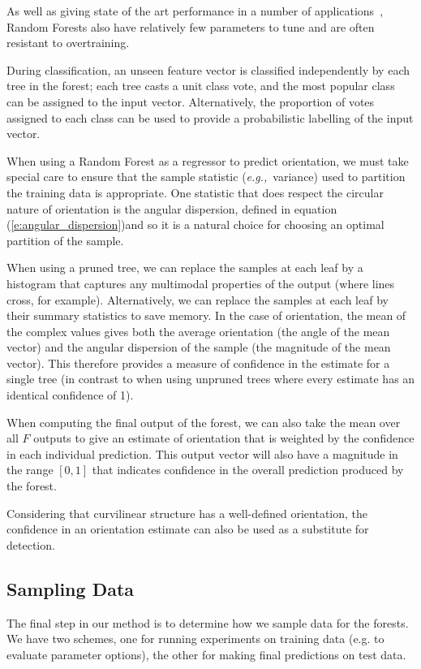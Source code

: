 \documentclass{IEEEtran}
\def\eg{\emph{e.g.,}}
\newcommand{\eref}[1]{(\ref{#1})}
\begin{document}
As well as giving state of the art performance in a number of applications~\cite{Criminisi}, Random Forests also have relatively few parameters to tune and are often resistant to overtraining.

%
During classification, an unseen feature vector is classified independently by each tree in the forest; each tree casts a unit class vote, and the most popular class can be assigned to the input vector. Alternatively, the proportion of votes assigned to each class can be used to provide a probabilistic labelling of the input vector.

When using a Random Forest as a regressor to predict orientation, we must take special care to ensure that the sample statistic (\eg~variance) used to partition the training data is appropriate. One statistic that does respect the circular nature of orientation is the angular dispersion, defined in equation \eref{e:angular_dispersion}and so it is a natural choice for choosing an optimal partition of the sample.

When using a pruned tree, we can replace the samples at each leaf by a histogram that captures  any multimodal properties of the output (where lines cross, for example). Alternatively, we can replace the samples at each leaf by their summary statistics to save memory. In the case of orientation, the mean of the complex values gives both the average orientation (the angle of the mean vector) and the angular dispersion of the sample (the magnitude of the mean vector). This therefore provides a measure of confidence in the estimate for a single tree (in contrast to when using unpruned trees where every estimate has an identical confidence of 1).

When computing the final output of the forest, we can also take the mean over all $F$ outputs to give an estimate of orientation that is weighted by the confidence in each individual prediction. This output vector will also have a magnitude in the range $[0,1]$ that indicates confidence in the overall prediction produced by the forest.

Considering that curvilinear structure has a well-defined orientation, the confidence in an orientation estimate can also be used as a substitute for detection.

\subsection{Sampling Data}
\label{s:learning_sampling_data}
The final step in our method is to determine how we sample data for the forests. We have two schemes, one for running experiments on training data (e.g. to evaluate parameter options), the other for making final predictions on test data.
\end{document}
